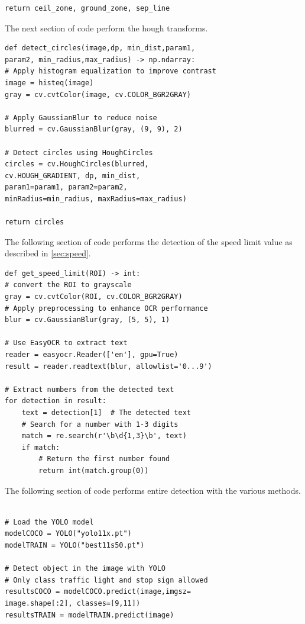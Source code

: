 \documentclass[10pt,conference,a4paper]{IEEEtran}
\begin{document}
\begin{appendices}
\begin{verbatim}
return ceil_zone, ground_zone, sep_line
\end{verbatim}
\label{lst:ceil}
The next section of code perform the hough transforms. 
\begin{verbatim}
def detect_circles(image,dp, min_dist,param1,
param2, min_radius,max_radius) -> np.ndarray:
# Apply histogram equalization to improve contrast
image = histeq(image)
gray = cv.cvtColor(image, cv.COLOR_BGR2GRAY)

# Apply GaussianBlur to reduce noise
blurred = cv.GaussianBlur(gray, (9, 9), 2)

# Detect circles using HoughCircles
circles = cv.HoughCircles(blurred, 
cv.HOUGH_GRADIENT, dp, min_dist, 
param1=param1, param2=param2, 
minRadius=min_radius, maxRadius=max_radius)

return circles
\end{verbatim}
\label{lst:hough}
The following section of code performs the detection of the speed limit value as described in \ref{sec:speed}. 
\begin{verbatim}
def get_speed_limit(ROI) -> int:
# convert the ROI to grayscale
gray = cv.cvtColor(ROI, cv.COLOR_BGR2GRAY)
# Apply preprocessing to enhance OCR performance
blur = cv.GaussianBlur(gray, (5, 5), 1)

# Use EasyOCR to extract text
reader = easyocr.Reader(['en'], gpu=True)
result = reader.readtext(blur, allowlist='0...9')

# Extract numbers from the detected text
for detection in result:
    text = detection[1]  # The detected text
    # Search for a number with 1-3 digits
    match = re.search(r'\b\d{1,3}\b', text)
    if match:
        # Return the first number found
        return int(match.group(0))
\end{verbatim}
\label{lst:speed}
The following section of code performs entire detection with the various methods.
\begin{verbatim}

# Load the YOLO model
modelCOCO = YOLO("yolo11x.pt")
modelTRAIN = YOLO("best11s50.pt")

# Detect object in the image with YOLO
# Only class traffic light and stop sign allowed
resultsCOCO = modelCOCO.predict(image,imgsz=
image.shape[:2], classes=[9,11])  
resultsTRAIN = modelTRAIN.predict(image)


\end{verbatim}
\end{appendices}
\end{document}
